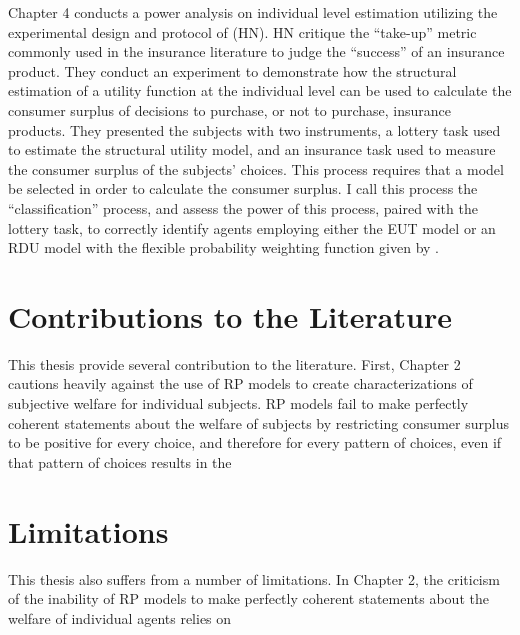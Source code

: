 \documentclass[../main.tex]{subfiles}
\begin{document}
Chapter 4 conducts a power analysis on individual level estimation utilizing the experimental design and protocol of \textcite{Harrison2016} (HN).
HN critique the \enquote{take-up} metric commonly used in the insurance literature to judge the \enquote{success} of an insurance product.
They conduct an experiment to demonstrate how the structural estimation of a utility function at the individual level can be used to calculate the consumer surplus of decisions to purchase, or not to purchase, insurance products.
They presented the subjects with two instruments, a lottery task used to estimate the structural utility model, and an insurance task used to measure the consumer surplus of the subjects' choices.
This process requires that a model be selected in order to calculate the consumer surplus.
I call this process the \enquote{classification} process, and assess the power of this process, paired with the lottery task, to correctly identify agents employing either the EUT model or an RDU model with the flexible probability weighting function given by \textcite{Prelec1998}.


\section{Contributions to the Literature}

This thesis provide several contribution to the literature.
First, Chapter 2 cautions heavily against the use of RP models to create characterizations of subjective welfare for individual subjects.
RP models fail to make perfectly coherent statements about the welfare of subjects by restricting consumer surplus to be positive for every choice, and therefore for every pattern of choices, even if that pattern of choices results in the


\section{Limitations}
This thesis also suffers from a number of limitations.
In Chapter 2, the criticism of the inability of RP models to make perfectly coherent statements about the welfare of individual agents relies on 



%
\end{document}
